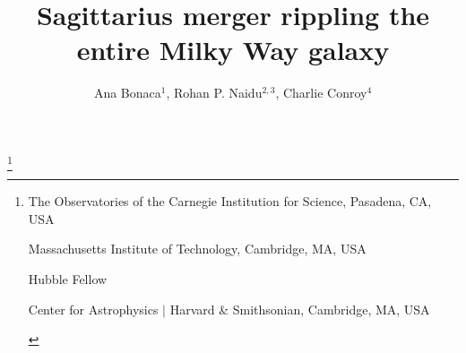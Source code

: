 \documentclass{natureprintstyle}
\title{\huge Sagittarius merger rippling the entire Milky Way galaxy}
\author{Ana Bonaca$^1$, Rohan P. Naidu$^{2,3}$, Charlie Conroy$^4$}
\begin{document}
\maketitle
\let\thefootnote\relax\footnote{

\begin{affiliations}
\item The Observatories of the Carnegie Institution for Science, Pasadena, CA, USA
\item Massachusetts Institute of Technology, Cambridge, MA, USA
\item Hubble Fellow
\item Center for Astrophysics $|$ Harvard \& Smithsonian,  Cambridge, MA, USA
\end{affiliations}
}
\end{document}
